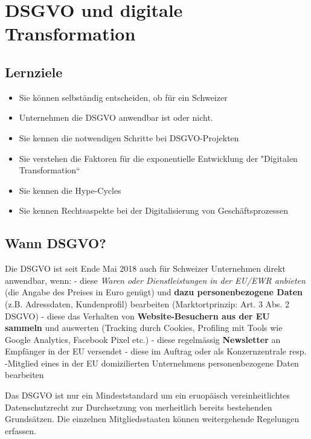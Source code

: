 \hypertarget{dsgvo-und-digitale-transformation}{%
\section{DSGVO und digitale
Transformation}\label{dsgvo-und-digitale-transformation}}

\hypertarget{lernziele}{%
\subsection{Lernziele}\label{lernziele}}

\begin{itemize}
\tightlist
\item
  Sie können selbständig entscheiden, ob für ein Schweizer
\item
  Unternehmen die DSGVO anwendbar ist oder nicht.
\item
  Sie kennen die notwendigen Schritte bei DSGVO-Projekten
\item
  Sie verstehen die Faktoren für die exponentielle Entwicklung der
  "Digitalen Transformation``
\item
  Sie kennen die Hype-Cycles
\item
  Sie kennen Rechtsaspekte bei der Digitalisierung von
  Geschäftsprozessen
\end{itemize}

\hypertarget{wann-dsgvo}{%
\subsection{Wann DSGVO?}\label{wann-dsgvo}}

Die DSGVO ist seit Ende Mai 2018 auch für Schweizer Unternehmen direkt
anwendbar, wenn: - diese \emph{Waren oder Dienstleistungen in der EU/EWR
anbieten} (die Angabe des Preises in Euro genügt) und \textbf{dazu
personenbezogene Daten} (z.B. Adressdaten, Kundenprofil) bearbeiten
(Marktortprinzip: Art. 3 Abs. 2 DSGVO) - diese das Verhalten von
\textbf{Website-Besuchern aus der EU sammeln} und auswerten (Tracking
durch Cookies, Profiling mit Tools wie Google Analytics, Facebook Pixel
etc.) - diese regelmässig \textbf{Newsletter} an Empfänger in der EU
versendet - diese im Auftrag oder als Konzernzentrale resp. -Mitglied
eines in der EU domizilierten Unternehmens personenbezogene Daten
bearbeiten

Das DSGVO ist nur ein Mindeststandard um ein eruopäisch
vereinheitlichtes Datenschutzrecht zur Durchsetzung von merheitlich
bereits bestehenden Grundsätzen. Die einzelnen Mitgliedsstaaten können
weitergehende Regelungen erfassen.

